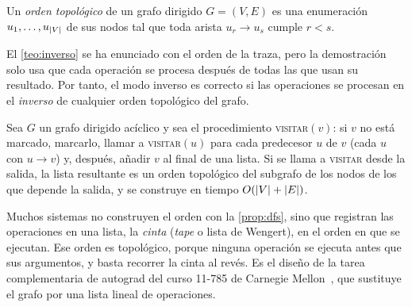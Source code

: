 \begin{definicion}\label{def:topologico}
Un \emph{orden topológico} de un grafo dirigido $G=(V,E)$ es una enumeración $u_1,\dots,u_{\lvert V\rvert}$ de sus nodos tal que toda arista $u_r\to u_s$ cumple $r<s$.
\end{definicion}

El \cref{teo:inverso} se ha enunciado con el orden de la traza, pero la demostración solo usa que cada operación se procesa después de todas las que usan su resultado. Por tanto, el modo inverso es correcto si las operaciones se procesan en el \emph{inverso} de cualquier orden topológico del grafo.

\begin{proposicion}\label{prop:dfs}
Sea $G$ un grafo dirigido acíclico y sea el procedimiento \textsc{visitar}$(v)$: si $v$ no está marcado, marcarlo, llamar a \textsc{visitar}$(u)$ para cada predecesor $u$ de $v$ (cada $u$ con $u\to v$) y, después, añadir $v$ al final de una lista. Si se llama a \textsc{visitar} desde la salida, la lista resultante es un orden topológico del subgrafo de los nodos de los que depende la salida, y se construye en tiempo $O(\lvert V\rvert+\lvert E\rvert)$.
\end{proposicion}

\addtocounter{definicion}{1}%

\begin{observacion}[La cinta]\label{obs:cinta}
Muchos sistemas no construyen el orden con la \cref{prop:dfs}, sino que registran las operaciones en una lista, la \emph{cinta} (\emph{tape} o lista de Wengert), en el orden en que se ejecutan. Ese orden es topológico, porque ninguna operación se ejecuta antes que sus argumentos, y basta recorrer la cinta al revés. Es el diseño de la tarea complementaria de autograd del curso 11-785 de Carnegie Mellon~\cite[§2.3]{cmu11785}, que sustituye el grafo por una lista lineal de operaciones.
\end{observacion}

\addtocounter{definicion}{1}%

